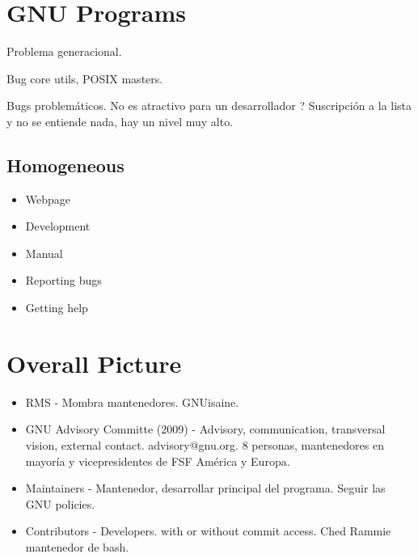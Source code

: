 \documentclass[11pt]{scrartcl}
\begin{document}
\section{GNU Programs}
\label{sec:gnu-programs}

\par Problema generacional.

\par Bug core utils, POSIX masters.

\par Bugs problem\'aticos. No es atractivo para un desarrollador ? Suscripci\'on a la lista y no se entiende nada, hay un nivel muy alto.


\subsection{Homogeneous}
\label{sub:homogeneous}

\begin{itemize}
	\item Webpage
	\item Development
	\item Manual
	\item Reporting bugs
	\item Getting help
\end{itemize}


\section{Overall Picture}
\label{sec:overall-pic}

\begin{itemize}
	\item RMS - Mombra mantenedores. GNUisaine.
	\item GNU Advisory Committe (2009) - Advisory, communication, transversal vision, external contact. advisory@gnu.org. 8 personas, mantenedores en mayor\'ia y vicepresidentes de FSF Am\'erica y Europa.
	\item Maintainers - Mantenedor, desarrollar principal del programa. Seguir las GNU policies.
	\item Contributors - Developers. with or without commit access. Ched Rammie mantenedor de bash.
\end{itemize}

\end{document}
